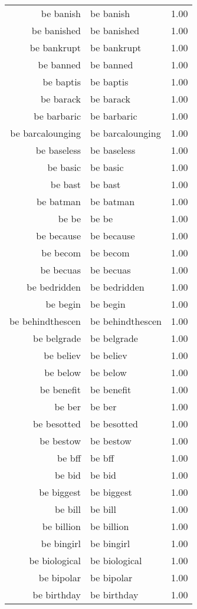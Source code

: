 \begin{table}[ht]
\begin{tabular}{rlr}
  be banish & be banish & 1.00 \\ 
  be banished & be banished & 1.00 \\ 
  be bankrupt & be bankrupt & 1.00 \\ 
  be banned & be banned & 1.00 \\ 
  be baptis & be baptis & 1.00 \\ 
  be barack & be barack & 1.00 \\ 
  be barbaric & be barbaric & 1.00 \\ 
  be barcalounging & be barcalounging & 1.00 \\ 
  be baseless & be baseless & 1.00 \\ 
  be basic & be basic & 1.00 \\ 
  be bast & be bast & 1.00 \\ 
  be batman & be batman & 1.00 \\ 
  be be & be be & 1.00 \\ 
  be because & be because & 1.00 \\ 
  be becom & be becom & 1.00 \\ 
  be becuas & be becuas & 1.00 \\ 
  be bedridden & be bedridden & 1.00 \\ 
  be begin & be begin & 1.00 \\ 
  be behindthescen & be behindthescen & 1.00 \\ 
  be belgrade & be belgrade & 1.00 \\ 
  be believ & be believ & 1.00 \\ 
  be below & be below & 1.00 \\ 
  be benefit & be benefit & 1.00 \\ 
  be ber & be ber & 1.00 \\ 
  be besotted & be besotted & 1.00 \\ 
  be bestow & be bestow & 1.00 \\ 
  be bff & be bff & 1.00 \\ 
  be bid & be bid & 1.00 \\ 
  be biggest & be biggest & 1.00 \\ 
  be bill & be bill & 1.00 \\ 
  be billion & be billion & 1.00 \\ 
  be bingirl & be bingirl & 1.00 \\ 
  be biological & be biological & 1.00 \\ 
  be bipolar & be bipolar & 1.00 \\ 
  be birthday & be birthday & 1.00 \\ 

\end{tabular}
\end{table}
